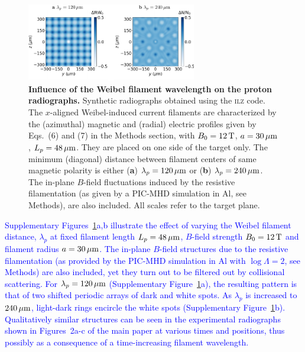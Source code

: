 \documentclass[aps,superscriptaddress]{revtex4}
\begin{document}
\begin{figure}[!t]
\centerline{
\includegraphics[width=0.66\textwidth]{FigS9.pdf} }
\caption{\label{fig:radiosup}
\textbf{Influence of the Weibel filament wavelength on the proton radiographs.}
Synthetic radiographs obtained using the \textsc{ilz} code. The $x$-aligned Weibel-induced current filaments are characterized by the (azimuthal) magnetic and (radial) electric profiles given by Eqs.~(6) and (7) in the Methods section, with $B_0=12\,\rm T$, $a=30\,\rm \mu m$, $L_p = 48\,\rm \mu m$. They are placed on one side of the target only. The minimum (diagonal) distance between filament centers of same magnetic polarity is either ({\bf a}) $\lambda_p=120\,\rm \mu m$ or ({\bf b}) $\lambda_p=240\,\rm \mu m$. The in-plane $B$-field fluctuations induced by the resistive filamentation (as given by a PIC-MHD simulation in Al, see Methods), are also included. All scales refer to  the target plane. 
}
\end{figure}

\textcolor{blue}{
Supplementary Figures~\ref{fig:radiosup}a,b illustrate the effect of varying the Weibel filament distance, $\lambda_p$ at fixed filament length $L_p=48\,\rm \mu m$, $B$-field strength $B_0=12\,\rm T$ and filament radius $a=30\,\rm\mu m$. 
The in-plane $B$-field structures due to the resistive filamentation (as provided by the PIC-MHD simulation \textcolor{blue}{in Al with $\log \Lambda =2$}, see Methods) are also included, yet they turn out to be filtered out by collisional scattering. 
For $\lambda_p=120\,\rm \mu m$ (Supplementary Figure~\ref{fig:radiosup}a), the resulting pattern is that of two shifted periodic arrays of dark and white spots. As $\lambda_p$ is increased to $240\,\rm \mu m$, light-dark rings encircle the white spots (Supplementary Figure~\ref{fig:radiosup}b). Qualitatively similar structures can be seen in the experimental radiographs shown in Figures~2a-c of the main paper at various times and positions, thus possibly as a consequence of a time-increasing filament wavelength.
}
\end{document}
